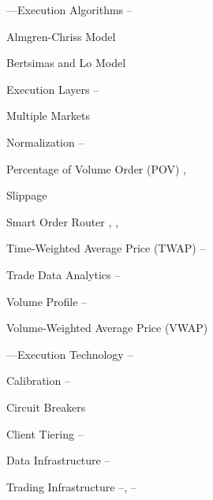\begin{minipage}{0.40\textwidth}
\noindent ---Execution Algorithms \pageref{in:exec_alg1}--\pageref{in:exec_alg2}
	\begin{flushright}
	Almgren-Chriss Model \pageref{in:alm_chriss} \par
	Bertsimas and Lo Model \pageref{in:bert_lo} \par
	Execution Layers \pageref{in:exec_layer1}--\pageref{in:exec_layer2} \par
	Multiple Markets \pageref{in:mult_mark} \par 
	Normalization \pageref{in:normalization1}--\pageref{in:normalization2} \par
	Percentage of Volume Order (POV) \pageref{in:pov1}, \pageref{in:pov2} \par
	Slippage \pageref{in:slippage} \par
	Smart Order Router \pageref{in:sor1}, \pageref{in:sor2}, \pageref{in:sor3} \par
	Time-Weighted Average Price (TWAP) \pageref{in:twap1}--\pageref{in:twap2} \par
	Trade Data Analytics \pageref{in:tda1}--\pageref{in:tda2} \par
	Volume Profile \pageref{in:vol_prof1}--\pageref{in:vol_prof2} \par
	Volume-Weighted Average Price (VWAP) \pageref{in:vwap}
	\end{flushright}

\noindent ---Execution Technology \pageref{in:exec_tech1}--\pageref{in:exec_tech2}
	\begin{flushright}
	Calibration \pageref{in:calb1}--\pageref{in:calb2} \par
	Circuit Breakers \pageref{in:circ_br} \par
	Client Tiering \pageref{in:client_t1}--\pageref{in:client_t2} \par
	Data Infrastructure \pageref{in:dat_infr1}--\pageref{in:dat_infr2} \par
	Trading Infrastructure \pageref{in:trad_infr1}--\pageref{in:trad_infr2}, \pageref{in:trad_infr3}--\pageref{in:trad_infr4}
	\end{flushright}
\vfill 
\end{minipage} \hfill
%
